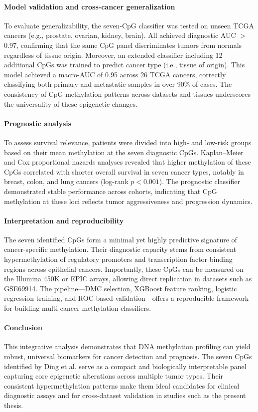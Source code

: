 \documentclass[10pt]{extarticle}
\begin{document}
\paragraph{Model validation and cross-cancer generalization}
To evaluate generalizability, the seven-CpG classifier was tested on unseen TCGA cancers (e.g., prostate, ovarian, kidney, brain). All achieved diagnostic AUC $>$ 0.97, confirming that the same CpG panel discriminates tumors from normals regardless of tissue origin.  
Moreover, an extended classifier including 12 additional CpGs was trained to predict cancer type (i.e., tissue of origin). This model achieved a macro-AUC of 0.95 across 26 TCGA cancers, correctly classifying both primary and metastatic samples in over 90\% of cases. The consistency of CpG methylation patterns across datasets and tissues underscores the universality of these epigenetic changes.

\paragraph{Prognostic analysis}
To assess survival relevance, patients were divided into high- and low-risk groups based on their mean methylation at the seven diagnostic CpGs. Kaplan–Meier and Cox proportional hazards analyses revealed that higher methylation of these CpGs correlated with shorter overall survival in seven cancer types, notably in breast, colon, and lung cancers (log-rank $p < 0.001$). The prognostic classifier demonstrated stable performance across cohorts, indicating that CpG methylation at these loci reflects tumor aggressiveness and progression dynamics.

\paragraph{Interpretation and reproducibility}
The seven identified CpGs form a minimal yet highly predictive signature of cancer-specific methylation. Their diagnostic capacity stems from consistent hypermethylation of regulatory promoters and transcription factor binding regions across epithelial cancers. Importantly, these CpGs can be measured on the Illumina 450K or EPIC arrays, allowing direct replication in datasets such as GSE69914. The pipeline—DMC selection, XGBoost feature ranking, logistic regression training, and ROC-based validation—offers a reproducible framework for building multi-cancer methylation classifiers.

\paragraph{Conclusion}
This integrative analysis demonstrates that DNA methylation profiling can yield robust, universal biomarkers for cancer detection and prognosis. The seven CpGs identified by Ding et al. serve as a compact and biologically interpretable panel capturing core epigenetic alterations across multiple tumor types. Their consistent hypermethylation patterns make them ideal candidates for clinical diagnostic assays and for cross-dataset validation in studies such as the present thesis.
\end{document}
